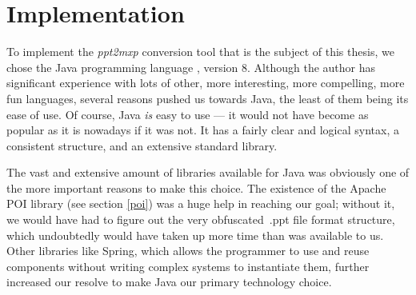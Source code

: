 
 \chapter{Implementation}
  \label{implementation}

  To implement the \emph{ppt2mxp} conversion tool that is the subject of this
  thesis, we chose the Java programming language \citep{gosling-1}, version 8.
  Although the author has significant experience with lots of other, more
  interesting, more compelling, more fun languages, several reasons pushed us
  towards Java, the least of them being its ease of use. Of course, Java
  \emph{is} easy to use --- it would not have become as popular as it is
  nowadays if it was not. It has a fairly clear and logical syntax, a consistent
  structure, and an extensive standard library.
 


  The vast and extensive amount of libraries available for Java was obviously
  one of the more important reasons to make this choice. The existence of the
  Apache POI library (see section \ref{poi}) was a huge help in reaching our
  goal; without it, we would have had to figure out the very obfuscated\ .ppt
  file format structure, which undoubtedly would have taken up more time than
  was available to us. Other libraries like Spring, which allows the programmer
  to use and reuse components without writing complex systems to instantiate
  them, further increased our resolve to make Java our primary technology
  choice.

